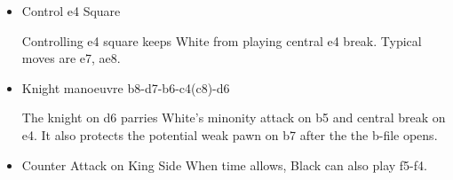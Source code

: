 \begin{itemize}
    \item{Control e4 Square}

    Controlling e4 square keeps White from playing central e4 break. Typical moves are \symqueen e7, \symrook ae8. 
    \item{Knight manoeuvre \symknight b8-d7-b6-c4(c8)-d6}

    The knight on d6 parries White's minonity attack on b5 and central break on e4. It also protects the potential weak pawn on b7 after the the b-file opens.

    \item{Counter Attack on King Side}
    When time allows, Black can also play f5-f4. 
    
\end{itemize} 



